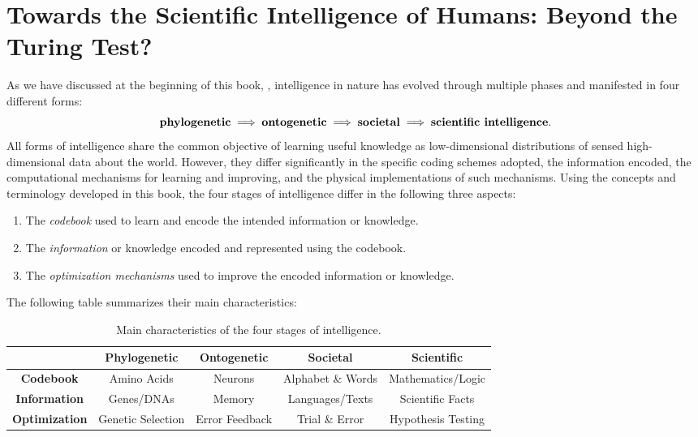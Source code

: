 \documentclass[../../book-main.tex]{subfiles}
\begin{document}
\section{Towards the Scientific Intelligence of Humans: Beyond the Turing Test?}
As we have discussed at the beginning of this book, , intelligence in nature has evolved through multiple phases and manifested in four different forms:
\begin{equation}
    \text{\textbf{phylogenetic}} \;
    \Longrightarrow \; \text{\textbf{ontogenetic}} \; 
    \Longrightarrow \; \text{\textbf{societal}} \; 
    \Longrightarrow \; \text{\textbf{scientific intelligence}}.
\end{equation}
All forms of intelligence share the common objective of learning useful knowledge as low-dimensional distributions of sensed high-dimensional data about the world. However, they differ significantly in the specific coding schemes adopted, the information encoded, the computational mechanisms for learning and improving, and the physical implementations of such mechanisms. Using the concepts and terminology developed in this book, the four stages of intelligence differ in the following three aspects:
\begin{enumerate}
    \item The \textit{codebook} used to learn and encode the intended information or knowledge.
    \item The \textit{information} or knowledge encoded and represented using the codebook. 
    \item The \textit{optimization mechanisms} used to improve the encoded information or knowledge.
\end{enumerate}
The following table summarizes their main characteristics:
\begin{table}[h]
    \centering
    \begin{tabular}{| c | c | c | c | c |}
    \hline & \textbf{Phylogenetic} & \textbf{Ontogenetic} & \textbf{Societal} & \textbf{Scientific}\\
    \hline
    \textbf{Codebook}  & Amino Acids & Neurons & Alphabet \& Words & Mathematics/Logic \\ [0.5ex]
    \hline 
    \textbf{Information} & Genes/DNAs & Memory & Languages/Texts & Scientific Facts\\ [0.5ex]
    \hline
    \textbf{Optimization} & Genetic Selection & Error Feedback & Trial \& Error & Hypothesis Testing \\  [0.5ex]
    \hline
    \end{tabular}
    \caption{Main characteristics of the four stages of intelligence.}    
\end{table}
\end{document}
